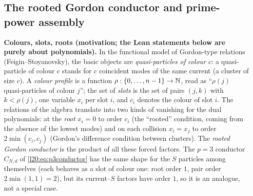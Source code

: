 \subsection{The rooted Gordon conductor and prime-power assembly}

\textbf{Colours, slots, roots (motivation; the Lean statements below are purely about polynomials).} In the functional model of Gordon-type relations (Feigin--Stoyanovsky), the basic objects are
\emph{quasi-particles of colour $c$}: a quasi-particle of colour $c$ stands for $c$ coincident modes of the same current (a cluster of
size $c$). A \emph{colour profile} is a function $\rho:\{0,\dots,n-1\}\to{\mathbb{N}}$, read as ``$\rho(j)$ quasi-particles of colour $j$''; the
set of \emph{slots} is the set of pairs $(j,k)$ with $k<\rho(j)$, one variable $x_i$ per slot $i$, and $c_i$ denotes the colour of slot $i$.
The relations of the algebra translate into two kinds of vanishing for the dual polynomials: at the \emph{root} $x_i=0$ to order $c_i$
(the ``rooted'' condition, coming from the absence of the lowest modes) and on each collision $x_i=x_j$ to order $2\min(c_i,c_j)$ (Gordon's
difference condition between clusters). The \emph{rooted Gordon conductor} is the product of all these forced factors. The $p=3$ conductor
$C_{N,d}$ of \eqref{l20:eq:p3conductor} has the same shape for the $S$ particles among themselves (each behaves as a slot of colour one:
root order $1$, pair order $2\min(1,1)=2$), but its current--$S$ factors have order $1$, so it is an analogue, not a special case.

